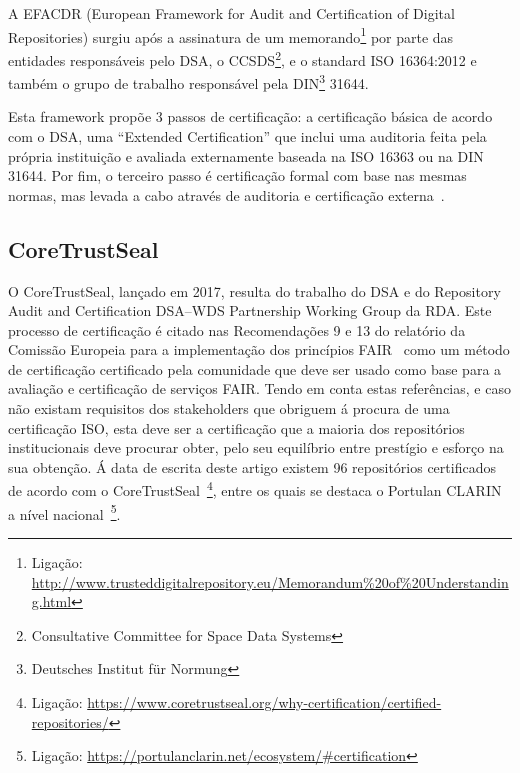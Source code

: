\documentclass[sigconf,nonacm]{acmart}
\begin{document}
A EFACDR (European Framework for Audit and Certification of Digital Repositories) surgiu após a assinatura de um memorando\footnote{Ligação: \url{http://www.trusteddigitalrepository.eu/Memorandum\%20of\%20Understanding.html}} por parte das entidades responsáveis pelo DSA, o CCSDS\footnote{Consultative Committee for Space Data Systems}, e o standard ISO 16364:2012 e também o grupo de trabalho responsável pela DIN\footnote{Deutsches Institut für Normung} 31644. 

Esta framework propõe 3 passos de certificação: a certificação básica de acordo com o DSA, uma ``Extended Certification'' que inclui uma auditoria feita pela própria instituição e avaliada externamente baseada na ISO 16363 ou na DIN 31644. Por fim, o terceiro passo é certificação formal com base nas mesmas normas, mas levada a cabo através de auditoria e certificação externa~\cite{Lindlar_Schwab_2019}.


\subsection{CoreTrustSeal} %
\label{sub:core_trust_seal}

O CoreTrustSeal, lançado em 2017, resulta do trabalho do DSA e do Repository Audit and Certification DSA–WDS Partnership Working Group da RDA. 
%
Este processo de certificação é citado nas Recomendações 9 e 13 do relatório da Comissão Europeia para a implementação dos princípios FAIR~\cite{hodson2018turning} como um método de certificação certificado pela comunidade que deve ser usado como base para a avaliação e certificação de serviços FAIR. Tendo em conta estas referências, e caso não existam requisitos dos stakeholders que obriguem á procura de uma certificação ISO, esta deve ser a certificação que a maioria dos repositórios institucionais deve procurar obter, pelo seu equilíbrio entre prestígio e esforço na sua obtenção.
%
Á data de escrita deste artigo existem 96 repositórios certificados de acordo com o CoreTrustSeal~\footnote{Ligação: \url{https://www.coretrustseal.org/why-certification/certified-repositories/}}, entre os quais se destaca o Portulan CLARIN a nível nacional~\footnote{Ligação: \url{https://portulanclarin.net/ecosystem/\#certification}}.


\end{document}
